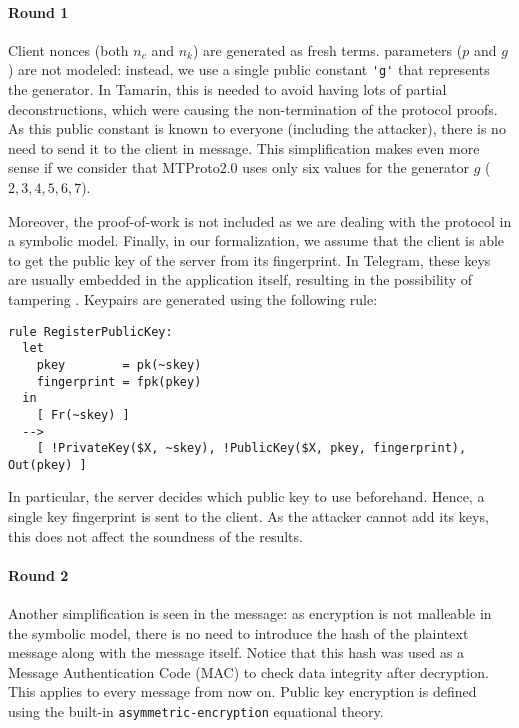 \lstset{language=tamarin}

\paragraph{Round 1}
Client nonces (both $n_c$ and $n_k$) are generated as fresh terms.
\DiHe{} parameters ($p$ and $g$) are not modeled: instead, we use a single public constant \lstinline{'g'} that represents the generator. In Tamarin, this is needed to avoid having lots of partial deconstructions, which were causing the non-termination of the protocol proofs. As this public constant is known to everyone (including the attacker), there is no need to send it to the client in  message. This simplification makes even more sense if we consider that MTProto2.0 uses only six values for the generator $g$ ($2, 3, 4, 5, 6, 7$).

Moreover, the proof-of-work is not included as we are dealing with the protocol in a symbolic model. Finally, in our formalization, we assume that the client is able to get the public key of the server from its fingerprint. In Telegram, these keys are usually embedded in the application itself, resulting in the possibility of tampering \cite{MTProto2-Proverif}. Keypairs are generated using the following rule:

\begin{lstlisting}
rule RegisterPublicKey:
  let
    pkey        = pk(~skey)
    fingerprint = fpk(pkey)
  in
    [ Fr(~skey) ]
  -->
    [ !PrivateKey($X, ~skey), !PublicKey($X, pkey, fingerprint), Out(pkey) ]
\end{lstlisting}

In particular, the server decides which public key to use beforehand. Hence, a single key fingerprint is sent to the client. As the attacker cannot add its keys, this does not affect the soundness of the results.

\paragraph{Round 2} Another simplification is seen in the  message: as encryption is not malleable in the symbolic model, there is no need to introduce the hash of the plaintext message along with the message itself. Notice that this hash was used as a Message Authentication Code (MAC) to check data integrity after decryption. This applies to every message from now on. Public key encryption is defined using the built-in \lstinline{asymmetric-encryption} equational theory.

